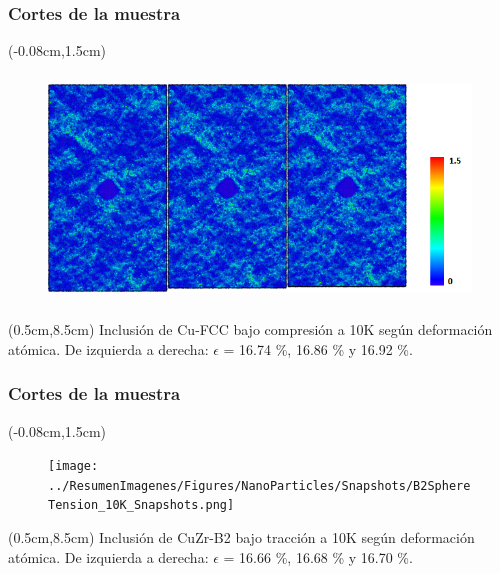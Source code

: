\begin{frame}
  \frametitle{Cortes de la muestra}
  \begin{textblock*}{12.6cm}(-0.08cm,1.5cm) 
    \begin{figure}[htp]
     \centering
     \includegraphics[height=6cm]{../ResumenImagenes/Figures/NanoParticles/Snapshots/cuSphereCompression_10K_Snapshots.png}
    \end{figure}
  \end{textblock*}
  \begin{textblock*}{12cm}(0.5cm,8.5cm) 
    \centering
      \small{Inclusi\'on de Cu-FCC bajo compresi\'on a 10K según deformaci\'on atómica. De izquierda a derecha: $\epsilon$ = 16.74 \%, 16.86 \% y 16.92 \%.}
    \end{textblock*}
\end{frame}

\begin{frame}
  \frametitle{Cortes de la muestra}
  \begin{textblock*}{12.6cm}(-0.08cm,1.5cm) 
    \begin{figure}[htp]
     \centering
     \texttt{[image: ../ResumenImagenes/Figures/NanoParticles/Snapshots/B2SphereTension\_10K\_Snapshots.png]}
    \end{figure}
  \end{textblock*}
  \begin{textblock*}{12cm}(0.5cm,8.5cm) 
    \centering
      \small{Inclusión de CuZr-B2 bajo tracción a 10K según deformación atómica. De izquierda a derecha: $\epsilon$ = 16.66 \%, 16.68 \% y 16.70 \%.}
    \end{textblock*}
\end{frame}

